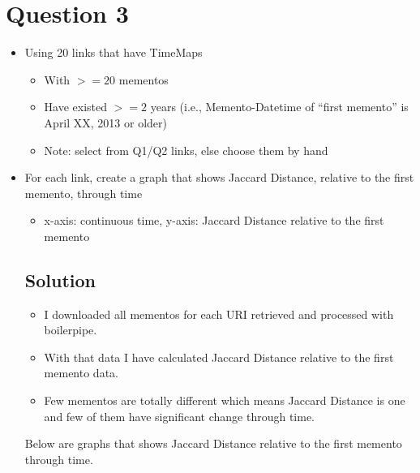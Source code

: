 
\section{Question 3}
\label{part1}

\begin{itemize}
\item Using 20 links that have TimeMaps
\begin{itemize}
\item With $>= 20$ mementos
\item Have existed  $>= 2$ years (i.e., Memento-Datetime of “first memento” is April XX, 2013 or older)
\item Note: select from Q1/Q2 links, else choose them by hand
\end{itemize}
\item For each link, create a graph that shows Jaccard Distance, relative to the first memento, through time
\begin{itemize}
\item x-axis: continuous time, y-axis: Jaccard Distance relative to the first memento
\end{itemize}
\subsection{Solution}
\begin{itemize}
 \item I downloaded all mementos for each URI retrieved and processed with boilerpipe.
 \item With that data I have calculated Jaccard Distance relative to the first memento data.
 \item Few mementos are totally different which means Jaccard Distance is one and few of them have 
significant change through time. 
\end{itemize}

Below are graphs that shows Jaccard Distance relative to the first memento through time.
\end{itemize}
